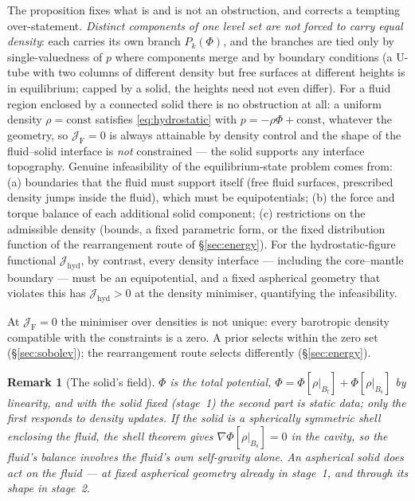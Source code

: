 \documentclass[11pt]{article}
\newtheorem{remark}{Remark}
\newcommand{\Jf}{\mathscr{J}}  %
\newcommand{\Bs}{B_{\mathrm{s}}}
\newcommand{\Bf}{B_{\mathrm{f}}}
\newcommand{\JF}{\Jf _{\mathrm{F}}}
\newcommand{\Jh}{\Jf _{\mathrm{hyd}}}
\begin{document}
The proposition fixes what is and is not an obstruction, and corrects a
tempting over-statement. \emph{Distinct components of one level set are
not forced to carry equal density}: each carries its own branch
$P_k(\Phi)$, and the branches are tied only by single-valuedness of $p$
where components merge and by boundary conditions (a U-tube with two
columns of different density but free surfaces at different heights is
in equilibrium; capped by a solid, the heights need not even differ).
For a fluid region enclosed by a connected solid there is no
obstruction at all: a uniform density $\rho = \text{const}$ satisfies
\eqref{eq:hydrostatic} with $p = -\rho\Phi + \text{const}$, whatever the
geometry, so $\JF = 0$ is always attainable by density control and the
shape of the fluid--solid interface is \emph{not} constrained --- the
solid supports any interface topography. Genuine infeasibility of the
equilibrium-state problem comes from: (a) boundaries that the fluid must
support itself (free fluid surfaces, prescribed density jumps inside the
fluid), which must be equipotentials; (b) the force and torque balance of
each additional solid component; (c) restrictions on the admissible
density (bounds, a fixed parametric form, or the fixed distribution
function of the rearrangement route of \S\ref{sec:energy}). For the
hydrostatic-figure functional $\Jh$, by contrast, every density
interface --- including the core--mantle boundary --- must be an
equipotential, and a fixed aspherical geometry that violates this has
$\Jh > 0$ at the density minimiser, quantifying the infeasibility.

At $\JF = 0$ the minimiser over densities is not unique: every
barotropic density compatible with the constraints is a zero. A prior
selects within the zero set (\S\ref{sec:sobolev}); the rearrangement
route selects differently (\S\ref{sec:energy}).

\begin{remark}[The solid's field]\label{rem:shell}
$\Phi$ is the total potential, $\Phi = \Phi[\rho|_{\Bf}] +
\Phi[\rho|_{\Bs}]$ by linearity, and with the solid fixed (stage~1) the
second part is static data; only the first responds to density updates.
If the solid is a spherically symmetric shell enclosing the fluid, the
shell theorem gives $\nabla\Phi[\rho|_{\Bs}] = 0$ in the cavity, so the
fluid's balance involves the fluid's own self-gravity alone. An
aspherical solid does act on the fluid --- at fixed aspherical geometry
already in stage~1, and through its shape in stage~2.
\end{remark}
\end{document}
